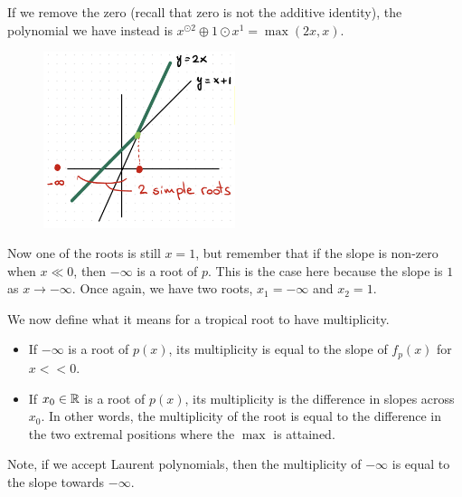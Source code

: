 \documentclass[12pt]{memoir}
\theoremstyle{definition}
\begin{document}
\begin{Ex}
    If we remove the zero (recall that zero is not the additive identity), the polynomial we have instead is $x^{\odot2}\oplus1\odot x^1=\max(2x,x)$.
    \begin{figure}[h!]
        \centering
        \includegraphics[width=0.5\textwidth]{figs/fig3-4SimpleRootsTropicalPolynomial.png}
        \label{fig:3.4-OneFiniteRootOneInfiniteRoot}
    \end{figure}

    Now one of the roots is still $x=1$, but remember that if the slope is non-zero when $x\ll 0$, then $-\infty$ is a root of $p$. This is the case here because the slope is $1$ as $x\to-\infty$. Once again, we have two roots, $x_1=-\infty$ and $x_2=1$.
\end{Ex}



\begin{Def}
    We now define what it means for a tropical root to have multiplicity.
    \begin{itemize}
        \item If $- \infty$ is a root of $p(x)$, its multiplicity is equal to the slope of $f_p(x)$ for $x<<0$.
        \item If $x_0\in\mathbb{R}$ is a root of $p(x)$, its multiplicity is the difference in slopes across $x_0$. In other words, the multiplicity of the root is equal to the difference in the two extremal positions where the $\max$ is attained.
    \end{itemize}
\end{Def}

Note, if we accept Laurent polynomials, then the multiplicity of $-\infty$ is equal to the slope towards $- \infty$.
\end{document}
